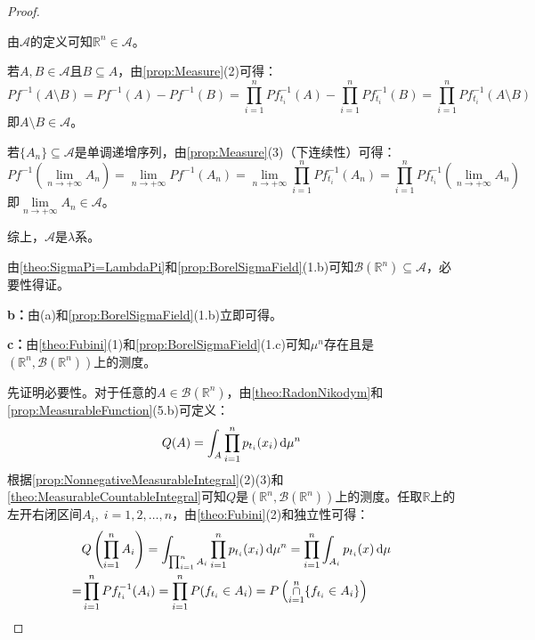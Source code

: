 \begin{proof}
\begin{equation*}
	\end{equation*}\par
	由$\mathscr{A}$的定义可知$\mathbb{R}^{n}\in\mathscr{A}$。\par
	若$A,B\in\mathscr{A}$且$B\subseteq A$，由\cref{prop:Measure}(2)可得：
	\begin{equation*}
		Pf^{-1}(A\setminus B)=Pf^{-1}(A)-Pf^{-1}(B)=\prod_{i=1}^{n}Pf_{t_i}^{-1}(A)-\prod_{i=1}^{n}Pf_{t_i}^{-1}(B)=\prod_{i=1}^{n}Pf_{t_i}^{-1}(A\setminus B)
	\end{equation*}
	即$A\setminus B\in\mathscr{A}$。\par
	若$\{A_n\}\subseteq\mathscr{A}$是单调递增序列，由\cref{prop:Measure}(3)（下连续性）可得：
	\begin{equation*}
		Pf^{-1}\left(\lim_{n\to+\infty}A_n\right)=\lim_{n\to+\infty}Pf^{-1}(A_n)=\lim_{n\to+\infty}\prod_{i=1}^{n}Pf_{t_i}^{-1}(A_n)=\prod_{i=1}^{n}Pf_{t_i}^{-1}\left(\lim_{n\to+\infty}A_n\right)
	\end{equation*}
	即$\lim\limits_{n\to+\infty}A_n\in\mathscr{A}$。\par
	综上，$\mathscr{A}$是$\lambda$系。\par
	由\cref{theo:SigmaPi=LambdaPi}和\cref{prop:BorelSigmaField}(1.b)可知$\mathcal{B}(\mathbb{R}^{n})\subseteq\mathscr{A}$，必要性得证。\par
	\textbf{b：}由(a)和\cref{prop:BorelSigmaField}(1.b)立即可得。\par
	\textbf{c：}由\cref{theo:Fubini}(1)和\cref{prop:BorelSigmaField}(1.c)可知$\mu^n$存在且是$(\mathbb{R}^{n},\mathcal{B}(\mathbb{R}^{n}))$上的测度。\par
	先证明必要性。对于任意的$A\in\mathcal{B}(\mathbb{R}^{n})$，由\cref{theo:RadonNikodym}和\cref{prop:MeasurableFunction}(5.b)可定义：
	\begin{equation*}
		Q(A)=\int_{A}\prod_{i=1}^{n}p_{t_i}(x_i)\mathop{}\!\mathrm{d}\mu^n
	\end{equation*}
	根据\cref{prop:NonnegativeMeasurableIntegral}(2)(3)和\cref{theo:MeasurableCountableIntegral}可知$Q$是$(\mathbb{R}^{n},\mathcal{B}(\mathbb{R}^{n}))$上的测度。任取$\mathbb{R}$上的左开右闭区间$A_i,\;i=1,2,\dots,n$，由\cref{theo:Fubini}(2)和独立性可得：
	\begin{align*}
		&Q\left(\prod_{i=1}^{n}A_i\right)=\int_{\prod_{i=1}^{n}A_i}\prod_{i=1}^{n}p_{t_i}(x_i)\dif\mu^n=\prod_{i=1}^{n}\int_{A_i}p_{t_i}(x)\dif\mu \\
		=&\prod_{i=1}^{n}Pf_{t_i}^{-1}(A_i)=\prod_{i=1}^{n}P(f_{t_i}\in A_i)=P\left(\underset{i=1}{\overset{n}{\cap}}\{f_{t_i}\in A_i\}\right) \\

\end{align*}
\end{proof}
